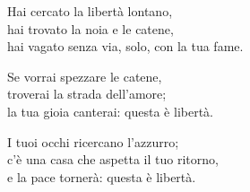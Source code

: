 
\strofa Hai cercato la libertà lontano,\\
hai trovato la noia e le catene,\\
hai vagato senza via, solo, con la tua fame.

\spazio


\spazio

\strofa Se vorrai spezzare le catene,\\
troverai la strada dell'amore;\\
la tua gioia canterai: questa è libertà.

\spazio


\spazio

\strofa I tuoi occhi ricercano l'azzurro;\\
c'è una casa che aspetta il tuo ritorno,\\
e la pace tornerà: questa è libertà.

\spazio

